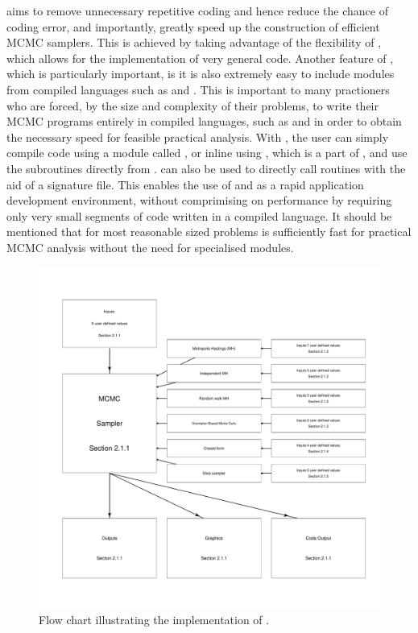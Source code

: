 \documentclass[article]{jss}
\begin{document}
 aims to remove unnecessary repetitive coding and hence
reduce the chance of coding error, and importantly, greatly speed up
the construction of efficient MCMC samplers. This is achieved by
taking advantage of the flexibility of , which allows
for the implementation of very general code. Another feature of
, which is particularly important, is it is also
extremely easy to include modules from compiled languages such as
 and . This is important to many
practioners who are forced, by the size and complexity of their
problems, to write their MCMC programs entirely in compiled languages,
such as  and  in order to obtain the
necessary speed for feasible practical analysis. With
, the user can simply compile  code
using a module called  \citep{F2PY}, or inline 
using , which is a part of  \citep{NumpyScipy},
and use the subroutines directly from . 
can also be used to directly call  routines with the aid
of a  signature file. This enables the use of
 and  as a rapid application development
environment, without comprimising on performance by requiring only very
small segments of code written in a compiled language. It should be
mentioned that for most reasonable sized problems  is
sufficiently fast for practical MCMC analysis without the need for
specialised modules.

%
\begin{figure}[t!]
  \begin{center}
\hspace*{-1cm}\includegraphics[width=18cm]{flowchart.pdf}    
\end{center}
\caption{Flow chart illustrating the implementation of
  .\label{fig:Flow-chart-ofPyMCMC}}

\end{figure}
\end{document}
